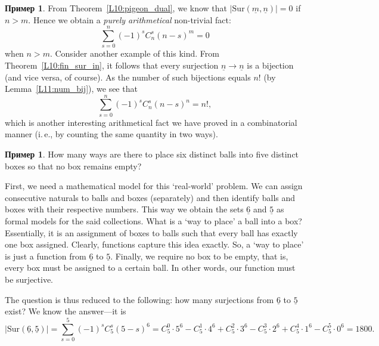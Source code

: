 \documentclass[12pt,notitlepage]{article}
\theoremstyle{plain}
\theoremstyle{definition}
\newtheorem{exm}[thm]{Пример}
\theoremstyle{plain}
\newcommand{\ul}[1]{\underline{#1}}
\newcommand{\1}{\mathbf{1}}
\newcommand{\0}{\mathbf{0}}
\newcommand{\mcomm}[1]{}
\begin{document}
\begin{exm}
	From Theorem~\ref{L10:pigeon_dual}, we know that $|\mathrm{Sur}(\ul{m}, \ul{n})| = 0$ if $n > m$. Hence we obtain a \emph{purely arithmetical} non-trivial fact:
	$$\sum\limits_{s = 0}^{n} (-1)^{s} C_n^s (n-s)^m = 0$$
	when $n > m$. Consider another example of this kind. From Theorem~\ref{L10:fin_sur_in}, it follows that every surjection $\ul{n} \to \ul{n}$ is a bijection (and vice versa, of course). As the number of such bijections equals $n!$ (by Lemma~\ref{L11:num_bij}), we see that
	$$\sum\limits_{s = 0}^{n} (-1)^{s} C_n^s (n-s)^n = n!,$$
	which is another interesting arithmetical fact we have proved in a combinatorial manner (i.\,e., by counting the same quantity in two ways).
\end{exm}

\mcomm{Sometimes, mathematical modeling of a ``real-world'' problem is non-trivial (and much more so for genuine \emph{real-world}) and the ``answer'' may depend on the model essentially. While the example below is straightforward in any respect, we urge the students to pay attention to modeling details. This will be especially important for probabilistic problems in  sections below.}

\begin{exm}
	How many ways are there to place six distinct balls into five distinct boxes so that no box remains empty?
	
	First, we need a mathematical model for this `real-world' problem. We can assign consecutive naturals to balls and boxes (separately) and then identify balls and boxes with their respective numbers. This way we obtain the sets $\ul{6}$ and $\ul{5}$ as formal models for the said collections. What is a `way to place' a ball into a box? Essentially, it is an assignment of boxes to balls such that every ball has exactly one box assigned. Clearly, functions capture this idea exactly. So, a `way to place' is just a function from $\ul{6}$ to $\ul{5}$. Finally, we require no box to be empty, that is, every box must be assigned to a certain ball. In other words, our function must be surjective.
	
	The question is thus reduced to the following: how many surjections from $\ul{6}$ to $\ul{5}$ exist? We know the answer---it is
	$$|\mathrm{Sur}(\ul{6}, \ul{5})| = \sum\limits_{s = 0}^{5} (-1)^{s} C_5^s (5-s)^6 = C_5^0 \cdot 5^6 - C_5^1 \cdot 4^6 + C_5^2 \cdot 3^6 - C_5^3 \cdot 2^6 + C_5^4 \cdot 1^6 - C_5^5 \cdot 0^6 = 1800.$$
	
\end{exm}
\end{document}
